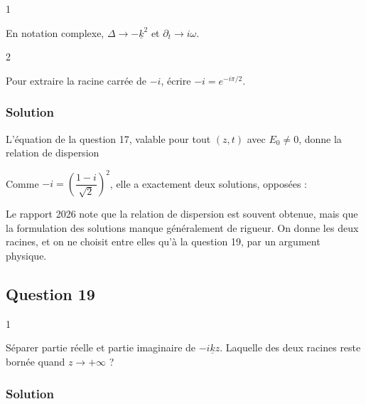 \documentclass[11pt,a4paper]{article}
\newcommand{\equationajustee}[1]{%
  \sbox{\boiteequation}{$\displaystyle #1$}%
  \ifdim\wd\boiteequation>\linewidth
    \[\resizebox{\linewidth}{!}{\usebox{\boiteequation}}\]%
  \else
    \[#1\]%
  \fi}
\begin{document}
\begin{indication}{1}

En notation complexe, \(\Delta \to -\underline k^2\) et \(\partial_t \to i\omega\).

\end{indication}

\begin{indication}{2}

Pour extraire la racine carrée de \(-i\), écrire \(-i = e^{-i\pi/2}\).

\end{indication}

\hypertarget{solution-17}{%
\subsubsection{Solution}\label{solution-17}}

L'équation de la question 17, valable pour tout \((z, t)\) avec \(E_0 \neq 0\), donne la relation de dispersion

\equationajustee{\underline k^2 = -i\mu_0\gamma\omega.}

Comme \(-i = \left(\dfrac{1-i}{\sqrt 2}\right)^2\), elle a exactement deux solutions, opposées :

\equationajustee{\boxed{\underline k = \pm(1-i)\sqrt{\frac{\mu_0\gamma\omega}{2}}}}

\begin{jury}

Le rapport 2026 note que la relation de dispersion est souvent obtenue, mais que la formulation des solutions manque généralement de rigueur. On donne les deux racines, et on ne choisit entre elles qu'à la question 19, par un argument physique.

\end{jury}

\hypertarget{question-19}{%
\subsection{Question 19}\label{question-19}}

\begin{indication}{1}

Séparer partie réelle et partie imaginaire de \(-i\underline k z\). Laquelle des deux racines reste bornée quand \(z \to +\infty\) ?

\end{indication}

\hypertarget{solution-18}{%
\subsubsection{Solution}\label{solution-18}}
\end{document}

